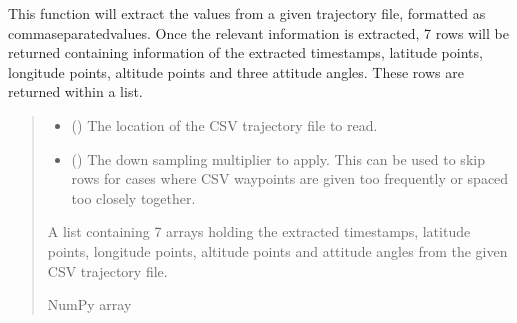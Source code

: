 \documentclass[letterpaper,10pt,english]{sphinxmanual}
\begin{document}
\begin{fulllineitems}
\label{\detokenize{modules/waypoints/generation:qnav.waypoints.generation.load_waypoint_csv}}
\pysigstartsignatures
{}
\pysigstopsignatures
\sphinxAtStartPar
This function will extract the values from a given trajectory file,
formatted as comma\sphinxhyphen{}separated\sphinxhyphen{}values. Once the relevant information is
extracted, 7 rows will be returned containing information of the extracted
timestamps, latitude points, longitude points, altitude points and three
attitude angles. These rows are returned within a list.
\begin{quote}\begin{description}
\begin{itemize}
\item {} 
\sphinxAtStartPar
{} () \textendash{} The location of the CSV trajectory file to read.

\item {} 
\sphinxAtStartPar
{} () \textendash{} The down sampling multiplier to apply.
This can be used to skip rows for cases where CSV waypoints are
given too frequently or spaced too closely together.

\end{itemize}

\sphinxAtStartPar
A list containing 7 arrays holding the extracted timestamps,
latitude points, longitude points, altitude points and attitude
angles from the given CSV trajectory file.

\sphinxAtStartPar
NumPy array

\end{description}\end{quote}

\end{fulllineitems}
\end{document}
